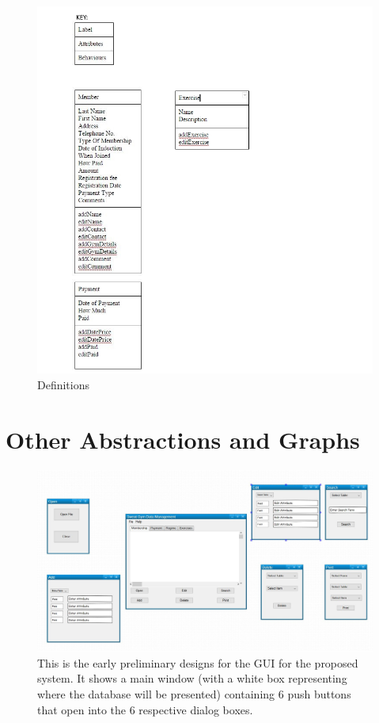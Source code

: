 \begin{figure}[H]
    \includegraphics[width=\textwidth]{ClassDefinitions.JPG}
    \caption{Definitions} \label{fig: Definitions}
\end{figure}

\section{Other Abstractions and Graphs}

\begin{figure}[H]
    \includegraphics[width=\textwidth]{GUI_DESIGNS.JPG}
    \caption{This is the early preliminary designs for the GUI for the proposed system. It shows a main window (with a white box representing where the database will be presented) containing 6 push buttons that open into the 6 respective dialog boxes.} \label{fig: Preliminary Gui Mockup Presented to Client}
\end{figure}



